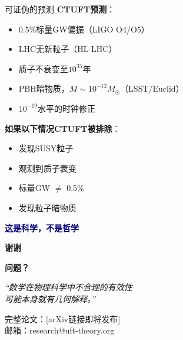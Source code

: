 \documentclass[aspectratio=169]{beamer}
\begin{document}
\begin{frame}{可证伪的预测}
\textbf{CTUFT预测}：
\begin{itemize}
    \item 0.5\%标量GW偏振（LIGO O4/O5）
    \item LHC无新粒子（HL-LHC）
    \item 质子不衰变至$10^{35}$年
    \item PBH暗物质，$M \sim 10^{-12} M_\odot$（LSST/Euclid）
    \item $10^{-19}$水平的时钟修正
\end{itemize}

\vspace{0.5cm}

\textbf{如果以下情况CTUFT被排除}：
\begin{itemize}
    \item 发现SUSY粒子
    \item 观测到质子衰变
    \item 标量GW $\neq$ 0.5\%
    \item 发现粒子暗物质
\end{itemize}

\vspace{0.5cm}
\begin{center}
\textcolor{darkblue}{\textbf{这是科学，不是哲学}}
\end{center}
\end{frame}

\begin{frame}
\begin{center}
\Huge
\textbf{谢谢}

\vspace{1cm}

\normalsize
\textbf{问题？}

\vspace{1cm}

\textit{``数学在物理科学中不合理的有效性\\
可能本身就有几何解释。''}

\vspace{0.5cm}

\small
完整论文：[arXiv链接即将发布]\\
邮箱：research@uft-theory.org
\end{center}
\end{frame}
\end{document}
